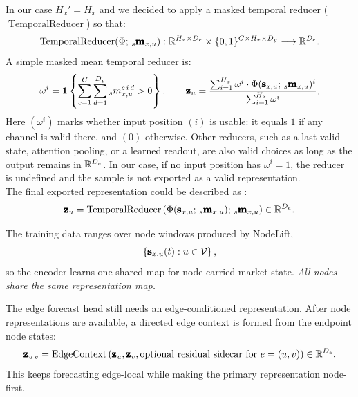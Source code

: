 In our case $H_x' = H_x$ and we decided to apply a masked temporal reducer ($\operatorname{TemporalReducer}$) so that:
\[
  \operatorname{TemporalReducer}(\Phi;\,{}_{s}\pmb{\mathbf{m}}_{x,u}) :
  \mathbb{R}^{H_x \times D_e}
  \times
  \{0,1\}^{C \times H_x\times D_y}
  \longrightarrow
  \mathbb{R}^{D_e}.
\]
A simple masked mean temporal reducer is:
\begin{equation}
\label{eq:masked-mean-reducer}
  \omega^i
  =
  \mathbf{1}
  \left\{
    \sum_{c=1}^{C}
    \sum_{d=1}^{D_y}
    {}_{s}m_{x,u}^{c\,i\,d}
    >
    0
  \right\},
  \qquad
  \pmb{\mathbf{z}}_{u}
  =
  \frac{
    \sum_{i=1}^{H_x}
    \omega^i\cdot
    \Phi(\pmb{\mathbf{s}}_{x,u};\,{}_{s}\pmb{\mathbf{m}}_{x,u})^{i}
  }{
    \sum_{i=1}^{H_x} \omega^i
  },
\end{equation}
Here $(\omega^i)$ marks whether input position $(i)$ is usable: it equals $1$
if any channel is valid there, and $(0)$ otherwise. Other reducers, such as a last-valid
state, attention pooling, or a learned readout, are also valid choices as long
as the output remains in $\mathbb{R}^{D_e}$. In our case, if no input position has $\omega^i=1$,
the reducer is undefined and the sample is not exported as a valid representation.\\

The final exported representation could be described as%
: 
\[
  \pmb{\mathbf{z}}_{u}
  =
  \operatorname{TemporalReducer}
  \left(
    \Phi(\pmb{\mathbf{s}}_{x,u};\,{}_{s}\pmb{\mathbf{m}}_{x,u});\,
    {}_{s}\pmb{\mathbf{m}}_{x,u}
  \right)
  \in
  \mathbb{R}^{D_e}.
\]

The training data ranges over node windows produced by NodeLift,
\[
  \left\{
    \pmb{\mathbf{s}}_{x,u}(t):u\in\mathcal{V}
  \right\},
\]
so the encoder learns one shared map for node-carried market state.
\textit{All nodes share the same representation map.}

The edge forecast head still needs an edge-conditioned representation.  After
node representations are available, a directed edge context is formed from the
endpoint node states:
\[
  \pmb{\mathbf{z}}_{u\,v}
  =
  \operatorname{EdgeContext}
  \left(
    \pmb{\mathbf{z}}_{u},
    \pmb{\mathbf{z}}_{v},
    \text{optional residual sidecar for }e=(u,v)
  \right)
  \in
  \mathbb{R}^{D_e}.
\]
This keeps forecasting edge-local while making the primary representation
node-first.












